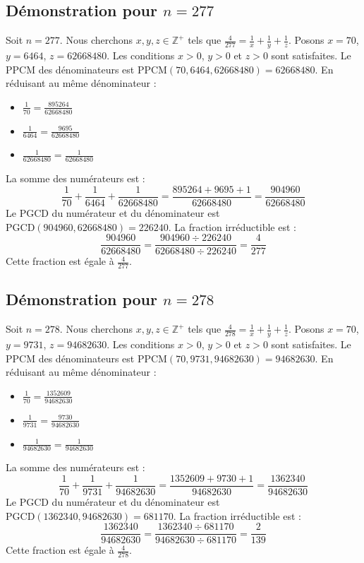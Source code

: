 \documentclass[11pt,a4paper]{article}
\begin{document}
\subsection{Démonstration pour $n = 277$}
Soit $n = 277$. Nous cherchons $x, y, z \in \mathbb{Z}^{+}$ tels que $\frac{4}{277} = \frac{1}{x} + \frac{1}{y} + \frac{1}{z}$.
Posons $x = 70$, $y = 6464$, $z = 62668480$.
Les conditions $x > 0$, $y > 0$ et $z > 0$ sont satisfaites.
Le PPCM des dénominateurs est $\text{PPCM}(70, 6464, 62668480) = 62668480$.
En réduisant au même dénominateur :
\begin{itemize}
    \item $\frac{1}{70} = \frac{895264}{62668480}$
    \item $\frac{1}{6464} = \frac{9695}{62668480}$
    \item $\frac{1}{62668480} = \frac{1}{62668480}$
\end{itemize}
La somme des numérateurs est :
$$ \frac{1}{70} + \frac{1}{6464} + \frac{1}{62668480} = \frac{895264 + 9695 + 1}{62668480} = \frac{904960}{62668480} $$
Le PGCD du numérateur et du dénominateur est $\text{PGCD}(904960, 62668480) = 226240$.
La fraction irréductible est :
$$ \frac{904960}{62668480} = \frac{904960 \div 226240}{62668480 \div 226240} = \frac{4}{277} $$
Cette fraction est égale à $\frac{4}{277}$.

\subsection{Démonstration pour $n = 278$}
Soit $n = 278$. Nous cherchons $x, y, z \in \mathbb{Z}^{+}$ tels que $\frac{4}{278} = \frac{1}{x} + \frac{1}{y} + \frac{1}{z}$.
Posons $x = 70$, $y = 9731$, $z = 94682630$.
Les conditions $x > 0$, $y > 0$ et $z > 0$ sont satisfaites.
Le PPCM des dénominateurs est $\text{PPCM}(70, 9731, 94682630) = 94682630$.
En réduisant au même dénominateur :
\begin{itemize}
    \item $\frac{1}{70} = \frac{1352609}{94682630}$
    \item $\frac{1}{9731} = \frac{9730}{94682630}$
    \item $\frac{1}{94682630} = \frac{1}{94682630}$
\end{itemize}
La somme des numérateurs est :
$$ \frac{1}{70} + \frac{1}{9731} + \frac{1}{94682630} = \frac{1352609 + 9730 + 1}{94682630} = \frac{1362340}{94682630} $$
Le PGCD du numérateur et du dénominateur est $\text{PGCD}(1362340, 94682630) = 681170$.
La fraction irréductible est :
$$ \frac{1362340}{94682630} = \frac{1362340 \div 681170}{94682630 \div 681170} = \frac{2}{139} $$
Cette fraction est égale à $\frac{4}{278}$.
\end{document}
